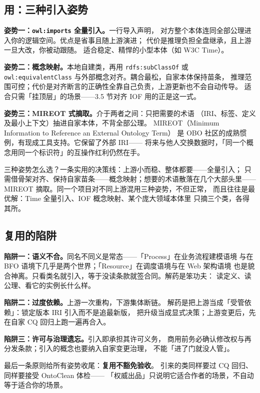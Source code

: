 \subsection{用：三种引入姿势}

\textbf{姿势一：\texttt{owl:imports} 全量引入。}一行导入声明，
对方整个本体连同全部公理进入你的逻辑空间。优点是省事且随上游演进；
代价是推理负担全盘继承，且上游一旦大改，你被动跟随。
适合稳定、精悍的小型本体（如 W3C Time）。

\textbf{姿势二：概念映射。}本地自建类，再用 \texttt{rdfs:subClassOf} 或
\texttt{owl:equivalentClass} 与外部概念对齐。耦合最松，自家本体保持苗条，
推理范围可控；代价是对齐断言的正确性全靠自己负责，上游更新也不会自动传导。
适合只需「挂顶层」的场景——3.5 节对齐 IOF 用的正是这一式。

\textbf{姿势三：MIREOT 式摘取。}介于两者之间：只把需要的术语
（IRI、标签、定义及最小上下文）抽进自家本体，不背全部公理。
MIREOT（Minimum Information to Reference an External Ontology Term）
是 OBO 社区的成熟惯例，有现成工具支持。它保留了外部 IRI——
将来与他人交换数据时，「同一个概念用同一个标识符」的互操作红利仍然在手。

三种姿势怎么选？一条实用的决策线：上游小而稳、整体都要——全量引入；
只需借骨架对齐、保持自家苗条——概念映射；想要的术语散落在几个大部头里——
MIREOT 摘取。同一个项目对不同上游混用三种姿势，不但正常，
而且往往是最优解：Time 全量引入、IOF 概念映射、某个庞大领域本体里
只摘三个类，各得其所。

\subsection{复用的陷阱}

\textbf{陷阱一：语义不合。}同名不同义是常态——「Process」在业务流程建模语境
与在 BFO 语境下几乎是两个世界；「Resource」在调度语境与在 Web 架构语境
也是貌合神离。只看类名就引入，等于没读条款就签合同。解药是笨功夫：
读定义、读公理、看它的实例长什么样。

\textbf{陷阱二：过度依赖。}上游一次重构，下游集体断链。
解药是把上游当成「受管依赖」：锁定版本 IRI 引入而不是追最新版，
把升级当成显式决策；上游变更后，先在自家 CQ 回归上跑一遍再合入。

\textbf{陷阱三：许可与治理遗忘。}引入即承担其许可义务，
商用前务必确认修改权与再分发条款；引入的概念也要纳入自家变更治理，
不能「进了门就没人管」。

最后一条原则给所有姿势收尾：\textbf{复用不豁免验收}。
引来的类同样要过 CQ 回归、同样要接受 OntoClean 体检——
「权威出品」只说明它适合作者的场景，不自动等于适合你的场景。


